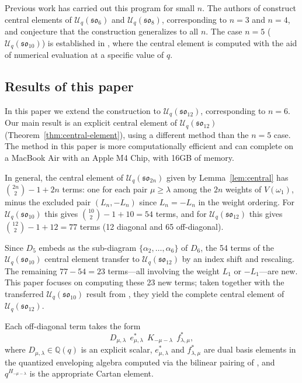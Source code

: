 \documentclass{ximera}
\newcommand{\so}{\mathfrak{so}}
\newcommand{\Uq}{\mathcal{U}_q}
\begin{document}
Previous work has carried out this program for small $n$. The authors of \cite{kuan2020} construct central elements of $\Uq(\so_6)$ and $\Uq(\so_8)$, corresponding to $n = 3$ and $n = 4$, and conjecture that the construction generalizes to all $n$. The case $n = 5$ ($\Uq(\so_{10})$) is established in \cite{RohrSellakumaranYin}, where the central element is computed with the aid of numerical evaluation at a specific value of $q$.

\subsection{Results of this paper}

In this paper we extend the construction to $\Uq(\so_{12})$, corresponding to $n = 6$. Our main result is an explicit central element of $\Uq(\so_{12})$ (Theorem~\ref{thm:central-element}), using a different method than the $n=5$ case. The method in this paper is more computationally efficient and can complete on a MacBook Air with an Apple M4 Chip, with 16GB of memory.

In general, the central element of $\Uq(\so_{2n})$ given by Lemma~\ref{lem:central} has $\binom{2n}{2} - 1 + 2n$ terms: one for each pair $\mu \geq \lambda$ among the $2n$ weights of $V(\omega_1)$, minus the excluded pair $(L_n, -L_n)$ since $L_n = -L_n$ in the weight ordering. For $\Uq(\so_{10})$ this gives $\binom{10}{2} - 1 + 10 = 54$ terms, and for $\Uq(\so_{12})$ this gives $\binom{12}{2} - 1 + 12 = 77$ terms (12 diagonal and 65 off-diagonal).

Since $D_5$ embeds as the sub-diagram $\{\alpha_2, \ldots, \alpha_6\}$ of $D_6$, the 54 terms of the $\Uq(\so_{10})$ central element transfer to $\Uq(\so_{12})$ by an index shift and rescaling. The remaining $77 - 54 = 23$ terms---all involving the weight $L_1$ or $-L_1$---are new. This paper focuses on computing these 23 new terms; taken together with the transferred $\Uq(\so_{10})$ result from \cite{RohrSellakumaranYin}, they yield the complete central element of $\Uq(\so_{12})$.

Each off-diagonal term takes the form
\[
    D_{\mu,\lambda} \;\, e^*_{\mu,\lambda} \;\, K_{-\mu-\lambda} \;\, f^*_{\lambda,\mu},
\]
where $D_{\mu,\lambda} \in \mathbb{Q}(q)$ is an explicit scalar, $e^*_{\mu,\lambda}$ and $f^*_{\lambda,\mu}$ are dual basis elements in the quantized enveloping algebra computed via the bilinear pairing of \cite[Chapter~6]{Jan95}, and $q^{H_{-\mu-\lambda}}$ is the appropriate Cartan element.
\end{document}
